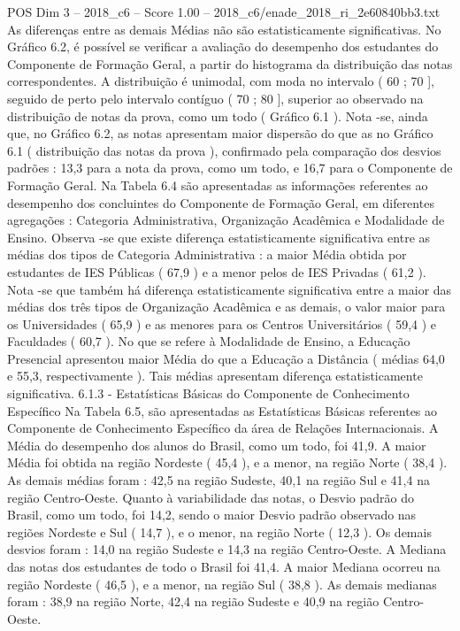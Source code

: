 \begin{textsample}{POS Dim 3 – 2018\_c6 – Score 1.00 – 2018\_c6/enade\_2018\_ri\_2e60840bb3.txt}
As diferenças entre as demais Médias não são estatisticamente significativas.
No Gráfico 6.2, é possível se verificar a avaliação do desempenho dos estudantes do Componente de Formação Geral, a partir do histograma da distribuição das notas correspondentes.
A distribuição é unimodal, com moda no intervalo ( 60 ; 70 ], seguido de perto pelo intervalo contíguo ( 70 ; 80 ], superior ao observado na distribuição de notas da prova, como um todo ( Gráfico 6.1 ).
Nota -se, ainda que, no Gráfico 6.2, as notas apresentam maior dispersão do que as no Gráfico 6.1 ( distribuição das notas da prova ), confirmado pela comparação dos desvios padrões : 13,3 para a nota da prova, como um todo, e 16,7 para o Componente de Formação Geral.
Na Tabela 6.4 são apresentadas as informações referentes ao desempenho dos concluintes do Componente de Formação Geral, em diferentes agregações : Categoria Administrativa, Organização Acadêmica e Modalidade de Ensino.
Observa -se que existe diferença estatisticamente significativa entre as médias dos tipos de Categoria Administrativa : a maior Média obtida por estudantes de IES Públicas ( 67,9 ) e a menor pelos de IES Privadas ( 61,2 ).
Nota -se que também há diferença estatisticamente significativa entre a maior das médias dos três tipos de Organização Acadêmica e as demais, o valor maior para os Universidades ( 65,9 ) e as menores para os Centros Universitários ( 59,4 ) e Faculdades ( 60,7 ).
No que se refere à Modalidade de Ensino, a Educação Presencial apresentou maior Média do que a Educação a Distância ( médias 64,0 e 55,3, respectivamente ).
Tais médias apresentam diferença estatisticamente significativa. 6.1.3 - Estatísticas Básicas do Componente de Conhecimento Específico Na Tabela 6.5, são apresentadas as Estatísticas Básicas referentes ao Componente de Conhecimento Específico da área de Relações Internacionais.
A Média do desempenho dos alunos do Brasil, como um todo, foi 41,9.
A maior Média foi obtida na região Nordeste ( 45,4 ), e a menor, na região Norte ( 38,4 ).
As demais médias foram : 42,5 na região Sudeste, 40,1 na região Sul e 41,4 na região Centro-Oeste.
Quanto à variabilidade das notas, o Desvio padrão do Brasil, como um todo, foi 14,2, sendo o maior Desvio padrão observado nas regiões Nordeste e Sul ( 14,7 ), e o menor, na região Norte ( 12,3 ).
Os demais desvios foram : 14,0 na região Sudeste e 14,3 na região Centro-Oeste.
A Mediana das notas dos estudantes de todo o Brasil foi 41,4.
A maior Mediana ocorreu na região Nordeste ( 46,5 ), e a menor, na região Sul ( 38,8 ).
As demais medianas foram : 38,9 na região Norte, 42,4 na região Sudeste e 40,9 na região Centro-Oeste.

\end{textsample}

